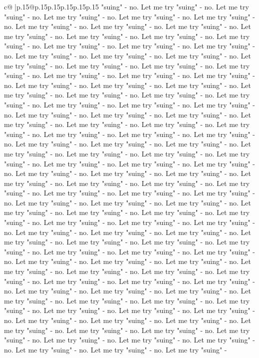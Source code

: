 \documentclass{article}
\begin{document}
{\begin{supertabular}{c@{$\;$}|p{.15\linewidth}@{}p{.15\linewidth}p{.15\linewidth}p{.15\linewidth}p{.15\linewidth}p{.15\linewidth}}
{{{"suing" {-} no. Let me try "suing" {-} no. Let me try "suing" {-} no. Let me try "suing" {-} no. Let me try "suing" {-} no. Let me try "suing" {-} no. Let me try "suing" {-} no. Let me try "suing" {-} no. Let me try "suing" {-} no. Let me try "suing" {-} no. Let me try "suing" {-} no. Let me try "suing" {-} no. Let me try "suing" {-} no. Let me try "suing" {-} no. Let me try "suing" {-} no. Let me try "suing" {-} no. Let me try "suing" {-} no. Let me try "suing" {-} no. Let me try "suing" {-} no. Let me try "suing" {-} no. Let me try "suing" {-} no. Let me try "suing" {-} no. Let me try "suing" {-} no. Let me try "suing" {-} no. Let me try "suing" {-} no. Let me try "suing" {-} no. Let me try "suing" {-} no. Let me try "suing" {-} no. Let me try "suing" {-} no. Let me try "suing" {-} no. Let me try "suing" {-} no. Let me try "suing" {-} no. Let me try "suing" {-} no. Let me try "suing" {-} no. Let me try "suing" {-} no. Let me try "suing" {-} no. Let me try "suing" {-} no. Let me try "suing" {-} no. Let me try "suing" {-} no. Let me try "suing" {-} no. Let me try "suing" {-} no. Let me try "suing" {-} no. Let me try "suing" {-} no. Let me try "suing" {-} no. Let me try "suing" {-} no. Let me try "suing" {-} no. Let me try "suing" {-} no. Let me try "suing" {-} no. Let me try "suing" {-} no. Let me try "suing" {-} no. Let me try "suing" {-} no. Let me try "suing" {-} no. Let me try "suing" {-} no. Let me try "suing" {-} no. Let me try "suing" {-} no. Let me try "suing" {-} no. Let me try "suing" {-} no. Let me try "suing" {-} no. Let me try "suing" {-} no. Let me try "suing" {-} no. Let me try "suing" {-} no. Let me try "suing" {-} no. Let me try "suing" {-} no. Let me try "suing" {-} no. Let me try "suing" {-} no. Let me try "suing" {-} no. Let me try "suing" {-} no. Let me try "suing" {-} no. Let me try "suing" {-} no. Let me try "suing" {-} no. Let me try "suing" {-} no. Let me try "suing" {-} no. Let me try "suing" {-} no. Let me try "suing" {-} no. Let me try "suing" {-} no. Let me try "suing" {-} no. Let me try "suing" {-} no. Let me try "suing" {-} no. Let me try "suing" {-} no. Let me try "suing" {-} no. Let me try "suing" {-} no. Let me try "suing" {-} no. Let me try "suing" {-} no. Let me try "suing" {-} no. Let me try "suing" {-} no. Let me try "suing" {-} no. Let me try "suing" {-} no. Let me try "suing" {-} no. Let me try "suing" {-} no. Let me try "suing" {-} no. Let me try "suing" {-} no. Let me try "suing" {-} no. Let me try "suing" {-} no. Let me try "suing" {-} no. Let me try "suing" {-} no. Let me try "suing" {-} no. Let me try "suing" {-} no. Let me try "suing" {-} no. Let me try "suing" {-} no. Let me try "suing" {-} no. Let me try "suing" {-} no. Let me try "suing" {-} no. Let me try "suing" {-} no. Let me try "suing" {-} no. Let me try "suing" {-} no. Let me try "suing" {-} no. Let me try "suing" {-} no. Let me try "suing" {-} no. Let me try "suing" {-} no. Let me try "suing" {-} no. Let me try "suing" {-} no. Let me try "suing" {-} no. Let me try "suing" {-} no. Let me try "suing" {-} no. Let me try "suing" {-} no. Let me try "suing" {-} no. Let me try "suing" {-} no. Let me try "suing" {-} no. Let me try "suing" {-} }}}
\end{supertabular}}
\end{document}
